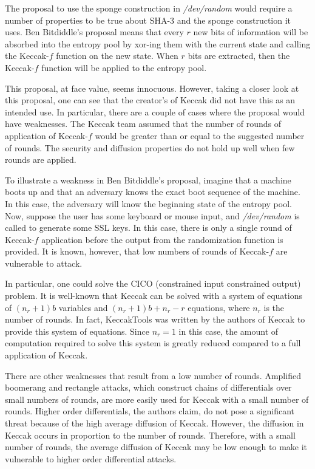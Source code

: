 \documentclass[psamsfonts]{amsart}
\begin{document}
The proposal to use the sponge construction in \emph{/dev/random} would require a number of properties to be true about SHA-3 and the sponge construction it uses. Ben Bitdiddle's proposal means that every $r$ new bits of information will be absorbed into the entropy pool by xor-ing them with the current state and calling the Keccak-$f$ function on the new state. When $r$ bits are extracted, then the Keccak-$f$ function will be applied to the entropy pool.

This proposal, at face value, seems innocuous. However, taking a closer look at this proposal, one can see that the creator's of Keccak did not have this as an intended use. In particular, there are a couple of cases where the proposal would have weaknesses. The Keccak team assumed that the number of rounds of application of Keccak-$f$ would be greater than or equal to the suggested number of rounds. The security and diffusion properties do not hold up well when few rounds are applied.

To illustrate a weakness in Ben Bitdiddle's proposal, imagine that a machine boots up and that an adversary knows the exact boot sequence of the machine. In this case, the adversary will know the beginning state of the entropy pool. Now, suppose the user has some keyboard or mouse input, and \emph{/dev/random} is called to generate some SSL keys. In this case, there is only a single round of Keccak-$f$ application before the output from the randomization function is provided. It is known, however, that low numbers of rounds of Keccak-$f$ are vulnerable to attack.

In particular, one could solve the CICO (constrained input constrained output) problem. It is well-known that Keccak can be solved with a system of equations of $(n_r + 1)b$ variables and $(n_r+1)b + n_r - r$ equations, where $n_r$ is the number of rounds. In fact, KeccakTools was written by the authors of Keccak to provide this system of equations. Since $n_r = 1$ in this case, the amount of computation required to solve this system is greatly reduced compared to a full application of Keccak.

There are other weaknesses that result from a low number of rounds. Amplified boomerang and rectangle attacks, which construct chains of differentials over small numbers of rounds, are more easily used for Keccak with a small number of rounds. Higher order differentials, the authors claim, do not pose a significant threat because of the high average diffusion of Keccak. However, the diffusion in Keccak occurs in proportion to the number of rounds. Therefore, with a small number of rounds, the average diffusion of Keccak may be low enough to make it vulnerable to higher order differential attacks.
\end{document}

